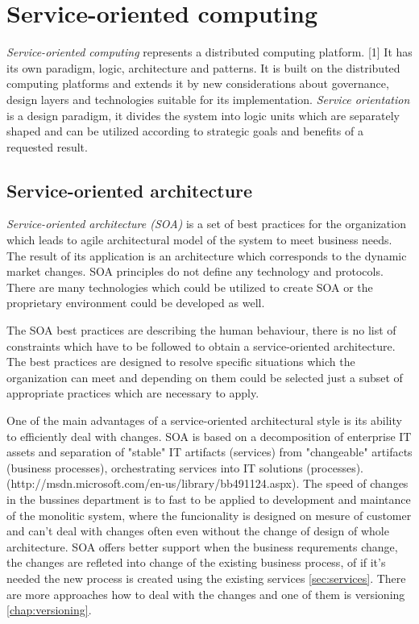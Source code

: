\chapter{Service-oriented computing}
\label{chap:service-oriented computing}
\emph{Service-oriented computing} represents a distributed computing platform. [1] It has its own paradigm, logic, architecture and patterns. It is built on the distributed computing platforms and extends it by new considerations about governance, design layers and technologies suitable for its implementation.
\emph{Service orientation} is a design paradigm, it divides the system into logic units which are separately shaped and can be utilized according to strategic goals and benefits of a requested result.

\section{Service-oriented architecture}
\emph{Service-oriented architecture (SOA)} is a set of best practices for the organization which leads to agile architectural model of the system to meet business needs. The result of its application is an architecture which corresponds to the dynamic market changes. SOA principles do not define any technology and protocols. There are many technologies which could be utilized to create SOA or the proprietary environment could be developed as well. 

The SOA best practices are describing the human behaviour, there is no list of constraints which have to be followed to obtain a service-oriented architecture. The best practices are designed to resolve specific situations which the organization can meet and depending on them could be selected just a subset of appropriate practices which are necessary to apply.

One of the main advantages of a service-oriented architectural style is its ability to efficiently deal with changes. SOA is based on a decomposition of enterprise IT assets and separation of "stable" IT artifacts (services) from "changeable" artifacts (business processes), orchestrating services into IT solutions (processes). (http://msdn.microsoft.com/en-us/library/bb491124.aspx). The speed of changes in the bussines department is to fast to be applied to development and maintance of the monolitic system, where the funcionality is designed on mesure of customer and can't deal with changes often even without the change of design of whole architecture. SOA offers better support when the business requrements change, the changes are refleted into change of the existing business process, of if it's needed the new process is created using the existing services \ref{sec:services}. There are more approaches how to deal with the changes and one of them is versioning \ref{chap:versioning}.


